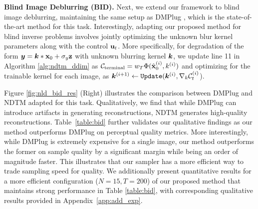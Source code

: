 \begin{table}[t]
\caption{Comparisons on \textbf{noisy Blind Image Deblurring (BID)} for the FFHQ 256$\times$256 dataset. NDTM outperforms DMPLug \citep{dmplug} by a significant margin while requiring an order of magnitude less sampling time (reported in minutes/img). \textbf{Bold}: best. $\dagger$: N=15, T=200, $\zeta$: N=15, T=400.}
\small
\centering
\setlength{\tabcolsep}{4pt}
\label{table:bid}
\end{table}

\textbf{Blind Image Deblurring (BID).} Next, we extend our framework to blind image deblurring, maintaining the same setup as DMPlug \citep{dmplug}, which is the state-of-the-art method for this task. Interestingly, adapting our proposed method for blind inverse problems involves jointly optimizing the unknown blur kernel parameters along with the control ${\mathbf{u}}_t$. More specifically, for degradation of the form ${\bm{y}} = {\bm{k}} * {\mathbf{x}}_0 + \sigma_y {\mathbf{z}}$ with unknown blurring kernel ${\bm{k}}$, we update line 11 in Algorithm \ref{alg:ndtm_ddim} as ${\mathcal{C}}_\text{terminal} = w_T\Phi(\hat{{\mathbf{x}}}_0^{(i)}, k^{(i)})$ and optimizing for the trainable kernel for each image, as ${\bm{k}}^{(i+1)} \gets \texttt{Update}({\bm{k}}^{(i)}, \nabla_{k} {\mathcal{C}}_t^{(i)}$).

Figure \ref{fig:nld_bid_res} (Right) illustrates the comparison between DMPlug and NDTM adapted for this task. Qualitatively, we find that while DMPlug can introduce artifacts in generating reconstructions, NDTM generates high-quality reconstructions. Table~\ref{table:bid} further validates our qualitative findings as our method outperforms DMPlug on perceptual quality metrics. More interestingly, while DMPlug is extremely expensive for a single image, our method outperforms the former on sample quality by a significant margin while being an order of magnitude faster. This illustrates that our sampler has a more efficient way to trade sampling speed for quality. We additionally present quantitative results for a more efficient configuration ($N=15, T=200$) of our proposed method that maintains strong performance in Table \ref{table:bid}, with corresponding qualitative results provided in Appendix~\ref{app:add_exp}.

